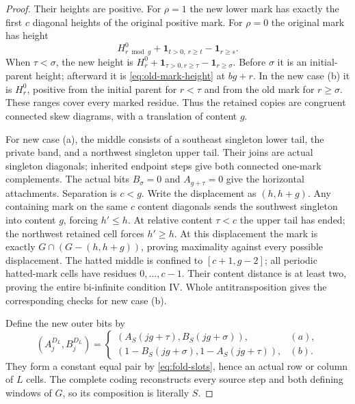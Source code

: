 \documentclass[11pt,a4paper]{amsart}
\numberwithin{equation}{section}
\theoremstyle{plain}
\theoremstyle{definition}
\newcommand{\one}{\mathbf1}
\begin{document}
\begin{proof}
Their heights are positive.  For \(\rho=1\) the new lower mark has exactly
the first \(c\) diagonal heights of the original positive mark.  For
\(\rho=0\) the original mark has height
\begin{equation}\label{eq:old-mark-height}
 H_{r\bmod g}^0+\one_{t>0,\ r\ge t}-\one_{r\ge s}.
\end{equation}
When \(\tau<\sigma\), the new height is
\(H_r^0+\one_{\tau>0,r\ge\tau}-\one_{r\ge\sigma}\).
Before \(\sigma\) it is an initial-parent height; afterward it is
\eqref{eq:old-mark-height} at \(bg+r\).  In the new case (b) it is \(H_r^0\),
positive from the initial parent for \(r<\tau\) and from the old mark for
\(r\ge\sigma\).  These ranges cover every marked residue.  Thus the retained
copies are congruent connected skew diagrams, with a translation of
content \(g\).

For new case (a), the middle consists of a southeast singleton lower tail,
the private band, and a northwest singleton upper tail.  Their joins are
actual singleton diagonals; inherited endpoint steps give both connected
one-mark complements.  The actual bits \(B_\sigma=0\) and
\(A_{g+\tau}=0\) give the horizontal attachments.  Separation is \(c<g\).
Write the displacement as \((h,h+g)\).  Any containing mark on the same
\(c\) content diagonals sends the southwest singleton into content \(g\),
forcing \(h'\le h\).  At relative content \(\tau<c\) the upper tail has
ended; the northwest retained cell forces \(h'\ge h\).  At this displacement
the mark is exactly \(G\cap(G-(h,h+g))\), proving maximality against every
possible displacement.  The hatted middle is confined to \([c+1,g-2]\);
all periodic hatted-mark cells have residues \(0,\ldots,c-1\).  Their content
distance is at least two, proving the entire bi-infinite condition IV.
Whole antitransposition gives the corresponding checks for new case (b).

Define the new outer bits by
\[
 (A_j^{D_L},B_j^{D_L})=
 \begin{cases}
 (A_S(jg+\tau),B_S(jg+\sigma)),&(a),\\
 (1-B_S(jg+\sigma),1-A_S(jg+\tau)),&(b).
 \end{cases}
\]
They form a constant equal pair by \eqref{eq:fold-slots}, hence an actual
row or column of \(L\) cells.  The complete coding reconstructs every source
step and both defining windows of \(G\), so its composition is literally \(S\).


\end{proof}
\end{document}
